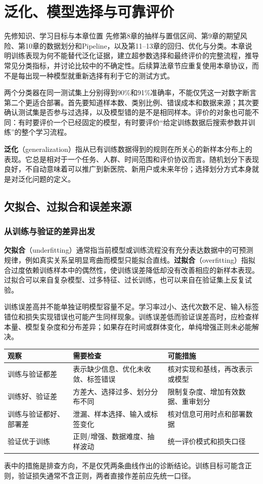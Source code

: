 \documentclass[UTF8,fontset=none,zihao=-4,a4paper]{ctexart}
\newcommand{\chapterpage}[1]{\clearpage\section{#1}}
\newcommand{\term}[1]{\textbf{#1}}
\numberwithin{equation}{section}
\numberwithin{figure}{section}
\begin{document}
\chapterpage{泛化、模型选择与可靠评价}\label{ch:evaluation}
\begin{infobox}{先修知识、学习目标与本章位置}
先修第8章的抽样与置信区间、第9章的期望风险、第10章的数据划分和Pipeline，以及第11--13章的回归、优化与分类。本章说明训练表现为何不能替代泛化证据，建立超参数选择和最终评价的完整流程，推导常见分类指标，并讨论比较中的不确定性。后续算法章节应重复使用本章协议，而不是每出现一种模型就重新选择有利于它的测试方式。
\end{infobox}
两个分类器在同一测试集上分别得到90\%和91\%准确率，不能仅凭这一对数字断言第二个更适合部署。首先要知道样本数、类别比例、错误成本和数据来源；其次要确认测试集是否参与过选择，以及模型错的是不是相同样本。评价的对象也可能不同：有时要评价一个已经固定的模型，有时要评价“给定训练数据后搜索参数并训练”的整个学习流程。

\term{泛化}（generalization）指从已有训练数据得到的规则在所关心的新样本分布上的表现。它总是相对于一个任务、人群、时间范围和评价协议而言。随机划分下表现良好，不自动意味着可以推广到新医院、新用户或未来年份；选择划分方式本身就是对泛化问题的定义。

\subsection{欠拟合、过拟合和误差来源}
\subsubsection{从训练与验证的差异出发}
\term{欠拟合}（underfitting）通常指当前模型或训练流程没有充分表达数据中的可预测规律，例如真实关系呈明显弯曲而模型只能拟合直线。\term{过拟合}（overfitting）指拟合过度依赖训练样本中的偶然性，使训练误差降低却没有改善相应的新样本表现。过拟合可以来自复杂模型、过多特征、过长训练，也可以来自在验证集上反复试验。

训练误差高并不能单独证明模型容量不足。学习率过小、迭代次数不足、输入标签错位和损失实现错误也可能产生同样现象。训练误差低而验证误差高时，应检查样本量、模型复杂度和分布差异；如果存在时间或群体变化，单纯增强正则未必能解决。

\begin{center}
\begin{tabularx}{\linewidth}{lYY}
\toprule
观察 & 需要检查 & 可能措施\\\midrule
训练与验证都差 & 表示缺少信息、优化未收敛、标签错误 & 核对实现和基线，再改表示或模型\\
训练好、验证差 & 方差大、选择过多、划分分布不同 & 限制复杂度、增加有效数据、重审划分\\
训练与验证都好、部署差 & 泄漏、样本选择、输入或标签变化 & 核对信息可用时点和部署数据\\
验证优于训练 & 正则/增强、数据难度、抽样波动 & 统一评价模式和损失口径\\\bottomrule
\end{tabularx}
\end{center}
表中的措施是排查方向，不是仅凭两条曲线作出的诊断结论。训练目标可能含正则，验证损失通常不含正则，两者直接作差前应先统一口径。
\end{document}
